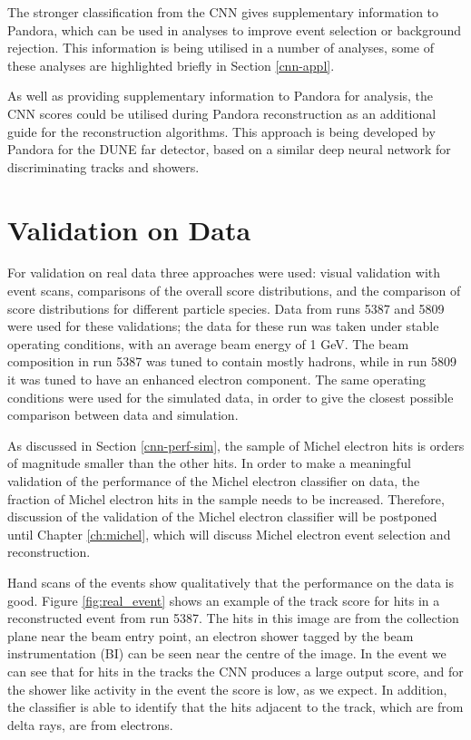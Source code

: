 The stronger classification from the CNN gives supplementary information to
Pandora, which can be used in analyses to improve event selection or background
rejection. This information is being utilised in a number of \protodune{}
analyses, some of these analyses are highlighted briefly in Section
\ref{cnn-appl}.

As well as providing supplementary information to Pandora for analysis, the CNN
scores could be utilised during Pandora reconstruction as an additional guide
for the reconstruction algorithms. This approach is being developed by Pandora
for the DUNE far detector, based on a similar deep neural network for 
discriminating tracks and showers\cite{chappel_poster}.

\section{Validation on \protodune{} Data} \label{cnn-perf-data}

For validation on real \protodune{} data three approaches were used: visual
validation with event scans, comparisons of the overall score distributions, 
and the comparison of score distributions for different particle species. Data 
from \protodune{} runs 5387 and 5809 were used for these validations; the data 
for these run was taken under stable operating conditions, with an average 
beam energy of 1 GeV. The beam composition in run 5387 was tuned to contain
mostly hadrons, while in run 5809 it was tuned to have an enhanced electron
component. The same operating conditions were used for the simulated data, in
order to give the closest possible comparison between data and simulation.

As discussed in Section \ref{cnn-perf-sim}, the sample of Michel electron hits
is orders of magnitude smaller than the other hits. In order to make a
meaningful validation of the performance of the Michel electron classifier on
data, the fraction of Michel electron hits in the sample needs to be increased.
Therefore, discussion of the validation of the Michel electron classifier will 
be postponed until Chapter \ref{ch:michel}, which will discuss Michel electron 
event selection and reconstruction.

Hand scans of the events show qualitatively that the performance on the data is
good. Figure \ref{fig:real_event} shows an example of the track score for hits
in a reconstructed event from run 5387. The hits in this image are from the
collection plane near the beam entry point, an electron shower tagged by the
beam instrumentation (BI) can be seen near the centre of the image. In the event
we can see that for hits in the tracks the CNN produces a large output score,
and for the shower like activity in the event the score is low, as we expect. In
addition, the classifier is able to identify that the hits adjacent to the 
track, which are from delta rays, are from electrons.

